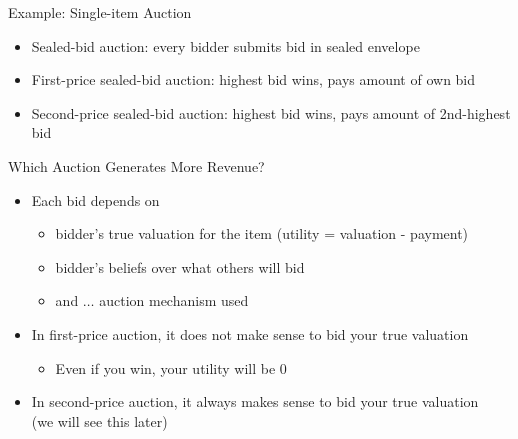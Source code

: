 \documentclass[11pt,aspectratio=169,handout]{beamer}
\begin{document}
  \begin{frame}{Example: Single-item Auction}
   \begin{itemize}
   \setlength{\itemsep}{1.5em}
    \item \alert{Sealed-bid auction}: every bidder submits bid in sealed envelope
    \item \alert{First-price} sealed-bid auction: highest bid wins, pays amount of own bid
    \item \alert{Second-price} sealed-bid auction: highest bid wins, pays amount of 2nd-highest bid
   \end{itemize}
  \end{frame}
  
  \begin{frame}{Which Auction Generates More Revenue?}
   \begin{itemize}
   \setlength{\itemsep}{1.5em}
    \item Each bid depends on
    \begin{itemize}
     \item bidder's true valuation for the item (utility = valuation - payment)
     \item bidder's beliefs over what others will bid
     \item and $\dots$ auction mechanism used
    \end{itemize}
    \item In first-price auction, it does not make sense to bid your true valuation
    \begin{itemize}
     \item Even if you win, your utility will be 0
    \end{itemize}
    \item In second-price auction, it always makes sense to bid your true valuation \\ (we will see this later)
   \end{itemize}
  \end{frame}
  
\end{document}
